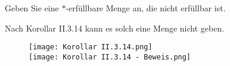 
\begin{exercise}[26]

Geben Sie eine $\ast$-erfüllbare Menge an, die nicht erfüllbar ist.

\end{exercise}


\begin{solution}

\phantom{}

Nach Korollar II.3.14 kann es solch eine Menge nicht geben.

\begin{figure}
    \begin{boxedin}
        \begin{center}
            \texttt{[image: Korollar II.3.14.png]} \\
            \vspace{0.5 cm}
            \texttt{[image: Korollar II.3.14 - Beweis.png]}
        \end{center}
    \end{boxedin}
\end{figure}


\end{solution}

